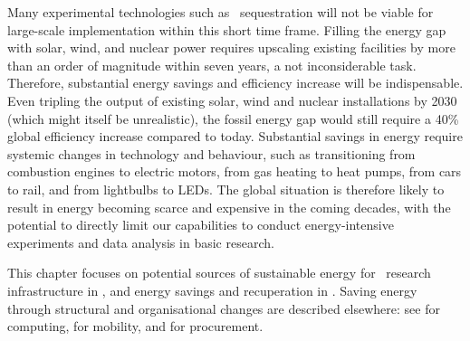 \documentclass[../SustainableHEP.tex]{subfiles}
\begin{document}


Many experimental technologies such as \CdO\ sequestration will not be viable for large-scale implementation within this short time frame. Filling the energy gap with solar, wind, and nuclear power requires upscaling existing facilities by more than an order of magnitude within seven years, a not inconsiderable task. Therefore, substantial energy savings and efficiency increase will be indispensable. Even tripling the output of existing solar, wind and nuclear installations by 2030 (which might itself be unrealistic), the fossil energy gap would still require a 40\% global efficiency increase compared to today. Substantial savings in energy require systemic changes in technology and behaviour, such as transitioning from combustion engines to electric motors, from gas heating to heat pumps, from cars to rail, and from lightbulbs to LEDs. The global situation is therefore likely to result in energy becoming scarce and expensive in the coming decades, with the potential to directly limit our capabilities to conduct energy-intensive experiments and data analysis in basic research.

This chapter focuses on potential sources of sustainable energy for \ACR\ research infrastructure in , and energy savings and recuperation in . Saving energy through structural and organisational changes are described elsewhere: see  for computing,  for mobility, and  for procurement.


\clearpage
\end{document}
